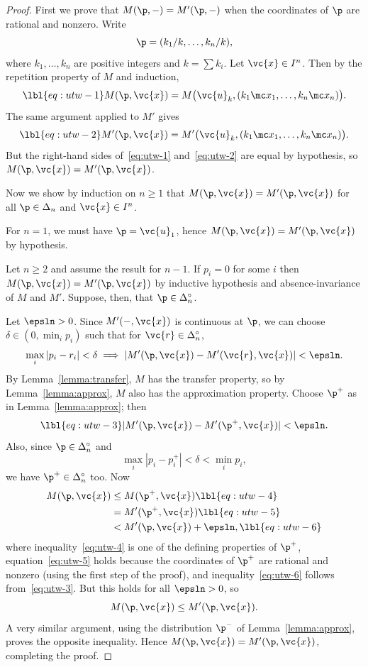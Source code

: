 \begin{proof}
First we prove that $M(\p, -) = M'(\p, -)$ when the coordinates of $\p$ are
rational and nonzero.  Write
\[
\p = (k_1/k, \ldots, k_n/k),
\]
where $k_1, \ldots, k_n$ are positive integers and $k = \sum k_i$.  Let
$\vc{x} \in I^n$.  Then by the repetition property of $M$ and induction,
% 
\begin{equation}
\lbl{eq:utw-1}
M(\p, \vc{x})
=
M\bigl( \vc{u}_k,
(k_1 \mc x_1, \ldots, k_n \mc x_n)
\bigr).
\end{equation}
% 
The same argument applied to $M'$ gives
% 
\begin{equation}
\lbl{eq:utw-2}
M'(\p, \vc{x})
=
M'\bigl( \vc{u}_k,
(k_1 \mc x_1, \ldots, k_n \mc x_n)
\bigr).
\end{equation}
% 
But the right-hand sides of~\eqref{eq:utw-1} and~\eqref{eq:utw-2} are
equal by hypothesis, so $M(\p, \vc{x}) = M'(\p, \vc{x})$.

Now we show by induction on $n \geq 1$ that $M(\p, \vc{x}) = M'(\p,
\vc{x})$ for all $\p \in \Delta_n$ and $\vc{x} \in I^n$.  

For $n = 1$, we must have $\p = \vc{u}_1$, hence $M(\p, \vc{x}) = M'(\p,
\vc{x})$ by hypothesis.

Let $n \geq 2$ and assume the result for $n - 1$.  If $p_i =
0$ for some $i$ then $M(\p, \vc{x}) = M'(\p, \vc{x})$ by inductive
hypothesis and absence-invariance of $M$ and $M'$.  Suppose, then,
that $\p \in \Delta_n^\circ$.

Let $\epsln > 0$.  Since $M'(-, \vc{x})$ is continuous at $\p$, we can
choose $\delta \in (0, \min_i p_i)$ such that for $\vc{r} \in
\Delta_n^\circ$,
\[
\max_i |p_i - r_i| < \delta
\implies
|M'(\p, \vc{x}) - M'(\vc{r}, \vc{x})| < \epsln.
\]
By Lemma~\ref{lemma:transfer}, $M$ has the transfer property, so by
Lemma~\ref{lemma:approx}, $M$ also has the approximation property.  Choose
$\p^+$ as in Lemma~\ref{lemma:approx}; then
% 
\begin{equation}
\lbl{eq:utw-3}
|M'(\p, \vc{x}) - M'(\p^+, \vc{x})| < \epsln.
\end{equation}
% 
Also, since $\p \in \Delta_n^\circ$ and 
\[
\max_i |p_i - p^+_i| < \delta < \min_i p_i,
\]
we have $\p^+ \in \Delta_n^\circ$ too.  Now
% 
\begin{align}
M(\p, \vc{x})   &
\leq
M(\p^+, \vc{x}) 
\lbl{eq:utw-4}        \\
&
=
M'(\p^+, \vc{x})
\lbl{eq:utw-5}        \\
&
<
M'(\p, \vc{x}) + \epsln,
\lbl{eq:utw-6}
\end{align}
% 
where inequality~\eqref{eq:utw-4} is one of the defining properties of
$\p^+$, equation~\eqref{eq:utw-5} holds because the coordinates of $\p^+$
are rational and nonzero (using the first step of the proof), and
inequality~\eqref{eq:utw-6} follows from~\eqref{eq:utw-3}.  But
this holds for all $\epsln > 0$, so
\[
M(\p, \vc{x}) \leq M'(\p, \vc{x}).
\]
A very similar argument, using the distribution $\p^-$ of
Lemma~\ref{lemma:approx}, proves the opposite inequality.  Hence $M(\p,
\vc{x}) = M'(\p, \vc{x})$, completing the proof.
\end{proof}

